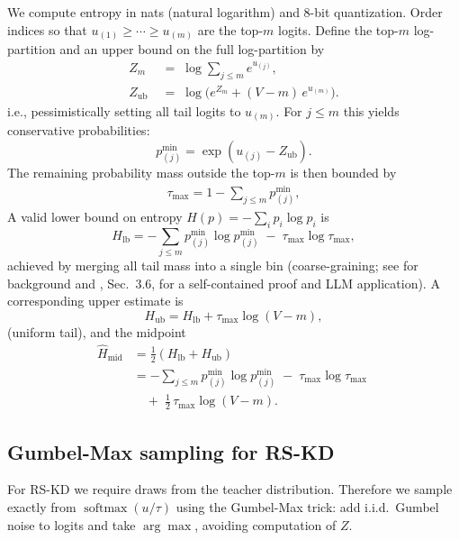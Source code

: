 \documentclass[11pt]{article}
\begin{document}
We compute entropy in nats (natural logarithm) and 8-bit quantization.
Order indices so that $u_{(1)} \geq \cdots \geq u_{(m)}$ are the top-$m$ logits.
Define the top-$m$ log-partition and an upper bound on the full log-partition by
\begin{align*}
	Z_m \;           & =\; \log \sum_{j \leq m} e^{u_{(j)}},           \\
	Z_{\text{ub}} \; & =\; \log\Big(e^{Z_m} + (V-m)\,e^{u_{(m)}}\Big).
\end{align*}
i.e., pessimistically setting all tail logits to $u_{(m)}$. For $j\le m$ this yields conservative probabilities:
\[
	p^{\min}_{(j)}=\exp(u_{(j)}-Z_{\text{ub}}).
\]
The remaining probability mass outside the top-$m$ is then bounded by
\begin{align*}
	\tau_{\max}=1-\sum_{j\le m}p^{\min}_{(j)},
\end{align*}
A valid lower bound on entropy $H(p)=-\sum_i p_i\log p_i$ is
\[
	H_{\text{lb}}=-\sum_{j\le m} p^{\min}_{(j)}\log p^{\min}_{(j)}\;-\;\tau_{\max}\log\tau_{\max},
\]
achieved by merging all tail mass into a single bin (coarse-graining; see \citep{cover2006elements} for background and \citep{kaltchenko2025entropyheatmap}, Sec.~3.6, for a self-contained proof and LLM application). A corresponding upper estimate is
\[
	H_{\text{ub}}=H_{\text{lb}}+\tau_{\max}\log(V-m),
\]
(uniform tail), and the midpoint
\begin{align*}
	\widehat{H}_{\text{mid}} & =\tfrac12\!\left(H_{\text{lb}}+H_{\text{ub}}\right)                                   \\
	                         & = -\sum_{j\le m}p^{\min}_{(j)}\log p^{\min}_{(j)} \;-\; \tau_{\max}\log\tau_{\max} \; \\
	                         & \quad +\; \tfrac12\,\tau_{\max}\log(V-m).
\end{align*}

\subsection{Gumbel-Max sampling for RS-KD}
For RS-KD we require draws from the teacher distribution.
Therefore we sample exactly from $\operatorname{softmax}(u/\tau)$ using the Gumbel-Max trick: add i.i.d.\ Gumbel noise to logits and take $\arg\max$, avoiding computation of $Z$.
\end{document}
